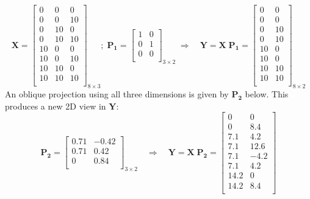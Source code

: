 \documentclass[
  letterpaper,
  10pt,
  krantz2]{krantz}
\begin{document}
\[
\mathbf{X} =
\begin{bmatrix} 
    0 & 0 & 0 \\ 
    0 & 0 & 10 \\ 
    0 & 10 & 0 \\ 
    0 & 10 & 10 \\ 
    10 & 0 & 0 \\ 
    10 & 0 & 10 \\ 
    10 & 10 & 0 \\ 
    10 & 10 & 10 \\ 
 \end{bmatrix}_{8 \times 3}
 ;\;
 \mathbf{P_1} =
 \begin{bmatrix} 
    1 & 0 \\ 
    0 & 1 \\ 
    0 & 0 \\ 
 \end{bmatrix}_{3 \times 2} 
 \;\Rightarrow\quad
 \mathbf{Y} = \mathbf{X} \; \mathbf{P_1} =
 \begin{bmatrix} 
    0 & 0 \\ 
    0 & 0 \\ 
    0 & 10 \\ 
    0 & 10 \\ 
    10 & 0 \\ 
    10 & 0 \\ 
    10 & 10 \\ 
    10 & 10 \\ 
 \end{bmatrix}_{8 \times 2} 
\] An oblique projection using all three dimensions is given by
\(\mathbf{P_2}\) below. This produces a new 2D view in \(\mathbf{Y}\):
\[
 \mathbf{P_2} =
\begin{bmatrix} 
    0.71 & -0.42 \\ 
    0.71 & 0.42 \\ 
    0 & 0.84 \\ 
 \end{bmatrix}_{3 \times 2}
 \quad\Rightarrow\quad
 \mathbf{Y} = \mathbf{X} \; \mathbf{P_2} =
\begin{bmatrix} 
    0 & 0 \\ 
    0 & 8.4 \\ 
    7.1 & 4.2 \\ 
    7.1 & 12.6 \\ 
    7.1 & -4.2 \\ 
    7.1 & 4.2 \\ 
    14.2 & 0 \\ 
    14.2 & 8.4 \\ 
 \end{bmatrix} 
\]
\end{document}
